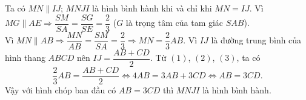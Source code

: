 \begin{ex}
{\begin{itemize}
			Ta có $MN\parallel IJ$; $MNJI$ là hình  bình hành khi và chỉ khi $MN=IJ$.
			\noindent Vì $MG\parallel AE\Rightarrow \dfrac{SM}{SA}=\dfrac{SG}{SE}=\dfrac{2}{3}$ ($G$ là trọng tâm  của tam giác $SAB$).\\
			Vì $MN\parallel AB\Rightarrow  \dfrac{MN}{AB}=\dfrac{SM}{SA}=\dfrac{2}{3} \Rightarrow MN=\dfrac{2}{3} AB$.
			 \noindent Vì $IJ$ là đường trung bình của hình thang $ABCD$ nên $IJ=\dfrac{AB+CD}{2}$.
			\noindent Từ $(1)$, $(2)$, $(3)$,  ta có
			\[\dfrac{2}{3} AB=\dfrac{AB+CD}{2} \Leftrightarrow 4AB=3AB+3CD\Leftrightarrow  AB=3CD.
			\] 
			Vậy với hình chóp ban đầu có $AB=3CD$  thì $MNJI$ là hình bình hành.
		\end{itemize}
	 }
\end{ex}

